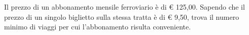 Il prezzo di un abbonamento mensile ferroviario è di € 125,00. 
Sapendo che il prezzo di un singolo biglietto sulla
stessa tratta è di € 9,50, trova il numero minimo di viaggi per cui 
l’abbonamento risulta conveniente.